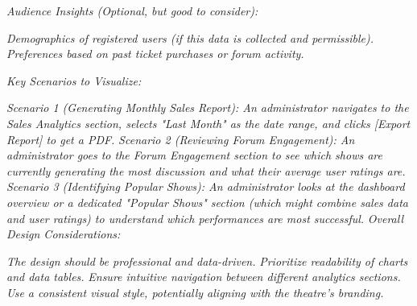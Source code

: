 \begin{enumerate}[itemsep=1ex]
    \textit{Audience Insights (Optional, but good to consider):}
    
    \textit{Demographics of registered users (if this data is collected and permissible).}
    \textit{Preferences based on past ticket purchases or forum activity.}
    
    \textit{Key Scenarios to Visualize:}

    \textit{Scenario 1 (Generating Monthly Sales Report): An administrator navigates to the Sales Analytics section, selects "Last Month" as the date range, and clicks [Export Report] to get a PDF.}
    \textit{Scenario 2 (Reviewing Forum Engagement): An administrator goes to the Forum Engagement section to see which shows are currently generating the most discussion and what their average user ratings are.}
    \textit{Scenario 3 (Identifying Popular Shows): An administrator looks at the dashboard overview or a dedicated "Popular Shows" section (which might combine sales data and user ratings) to understand which performances are most successful.}
    \textit{Overall Design Considerations:}

    \textit{The design should be professional and data-driven.}
    \textit{Prioritize readability of charts and data tables.}
    \textit{Ensure intuitive navigation between different analytics sections.}
    \textit{Use a consistent visual style, potentially aligning with the theatre's branding.}

\end{enumerate}
\sloppy